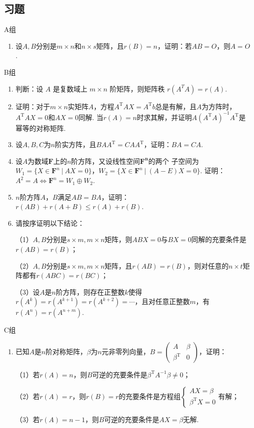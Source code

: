 \subsection{习题}
\centerline{\heiti A组}
\begin{enumerate}
	\item 设$A,B$分别是$m \times n$和$n \times s$矩阵，且$r(B)=n$，证明：若$AB=O$，则$A=O$.
\end{enumerate}
\centerline{\heiti B组}
\begin{enumerate}
	\item 判断：设 $A$ 是复数域上 $m \times n$ 阶矩阵，则矩阵秩 $r\left(A^T A\right)=r(A)$.
	\item 证明：对于$m \times n$实矩阵$A$，方程$A^\mathrm{T}AX = A^\mathrm{T}b$总是有解，且$A$为方阵时，$A^\mathrm{T}AX = 0$和$AX=0$同解.
	当$r(A)=n$时求其解，并证明$A(A^\mathrm{T}A)^{-1}A^\mathrm{T}$是幂等的对称矩阵.
	\item 设$A,B,C$为$n$阶实方阵，且$BAA^\mathrm{T}=CAA^\mathrm{T}$，证明：$BA=CA$.
	\item 设$A$为数域$\mathbf{F}$上的$n$阶方阵，又设线性空间$\mathbf{F^n}$的两个
	子空间为$W_1=\{X\in\mathbf{F}^n\ |\ AX=0\}$，$W_2=\{X\in\mathbf{F}^n\ |\ (A-E)X=0\}$.
	证明：$A^2=A \iff \mathbf{F}^n=W_1\oplus W_2$.
	\item $n$阶方阵$A$，$B$满足$AB=BA$，证明：$r(AB)+r(A+B)\le r(A)+r(B)$.
	\item 请按序证明以下结论：
	
	（1）$A,B$分别是$s \times m,m \times n$矩阵，则$ABX=0$与$BX=0$同解的充要条件是$r(AB)=r(B)$；

	（2）$A,B$分别是$s \times m,m \times n$矩阵，且$r(AB)=r(B)$，则对任意的$n \times t$矩阵都有$r(ABC)=r(BC)$；

	（3）设$A$是$n$阶方阵，则存在正整数$k$使得$r(A^k)=r(A^{k+1})=r(A^{k+2})=\cdots$，且对任意正整数$m$，有$r(A^n)=r(A^{n+m})$.
\end{enumerate}
\centerline{\heiti C组}
\begin{enumerate}
	\item 已知$A$是$n$阶对称矩阵，$\beta$为$n$元非零列向量，$B=\begin{pmatrix}
		A & \beta \\ \beta^\mathrm{T} & 0
	\end{pmatrix}$，证明：

	（1）若$r(A)=n$，则$B$可逆的充要条件是$\beta^\mathrm{T}A^{-1}\beta \neq 0$；

	（2）若$r(A)=r$，则$r(B)=r$的充要条件是方程组$\begin{cases}
		AX=\beta \\ \beta^\mathrm{T}X=0
	\end{cases}$有解；

	（3）若$r(A)=n-1$，则$B$可逆的充要条件是$AX=\beta$无解.
\end{enumerate}

